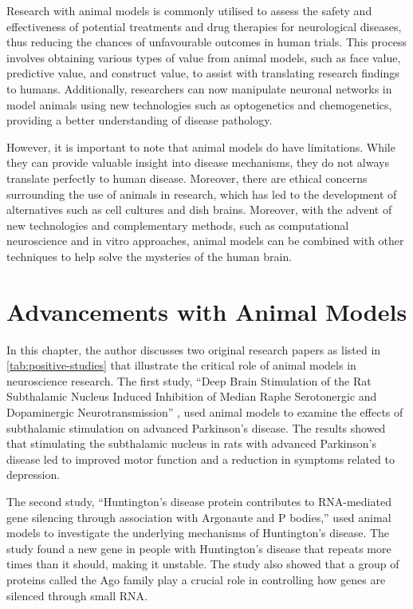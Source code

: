 \documentclass[10pt]{article}
\begin{document}
\begin{sloppypar}
  Research with animal models is commonly utilised to assess the safety and effectiveness of potential treatments and drug therapies for neurological diseases, thus reducing the chances of unfavourable outcomes in human trials. This process involves obtaining various types of value from animal models, such as face value, predictive value, and construct value, to assist with translating research findings to humans. Additionally, researchers can now manipulate neuronal networks in model animals using new technologies such as optogenetics and chemogenetics, providing a better understanding of disease pathology.

  However, it is important to note that animal models do have limitations. While they can provide valuable insight into disease mechanisms, they do not always translate perfectly to human disease. Moreover, there are ethical concerns surrounding the use of animals in research, which has led to the development of alternatives such as cell cultures and dish brains. Moreover, with the advent of new technologies and complementary methods, such as computational neuroscience and in vitro approaches, animal models can be combined with other techniques to help solve the mysteries of the human brain.

  \section{Advancements with Animal Models}
  \label{sec:advancements}

  In this chapter, the author discusses two original research papers as listed in \autoref{tab:positive-studies} that illustrate the critical role of animal models in neuroscience research. The first study, “Deep Brain Stimulation of the Rat Subthalamic Nucleus Induced Inhibition of Median Raphe Serotonergic and Dopaminergic Neurotransmission” \citep{kocabicak_deep_2014}, used animal models to examine the effects of subthalamic stimulation on advanced Parkinson’s disease. The results showed that stimulating the subthalamic nucleus in rats with advanced Parkinson’s disease led to improved motor function and a reduction in symptoms related to depression.

  The second study, “Huntington’s disease protein contributes to RNA-mediated gene silencing through association with Argonaute and P bodies,” \citep{savas_huntingtons_2008} used animal models to investigate the underlying mechanisms of Huntington’s disease. The study found a new gene in people with Huntington’s disease that repeats more times than it should, making it unstable. The study also showed that a group of proteins called the Ago family play a crucial role in controlling how genes are silenced through small RNA.


\end{sloppypar}
\end{document}
